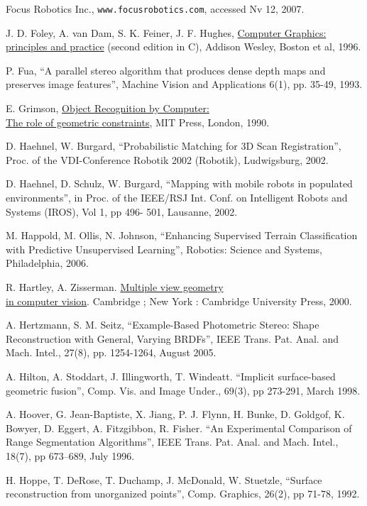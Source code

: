 \documentclass[twocolumn,oneside]{book}
\begin{document}
\begin{thebibliography}{99}
Focus Robotics Inc.,
\verb+www.focusrobotics.com+, accessed Nv 12, 2007.

J. D. Foley, A. van Dam, S. K. Feiner, J. F. Hughes,
{\underline{Computer Graphics: principles and practice}} (second edition in C),
Addison Wesley, Boston et al, 1996.

P. Fua,
``A parallel stereo algorithm that produces dense depth maps and preserves image features'',
Machine Vision and Applications 6(1), pp. 35-49, 1993.

E. Grimson,
{\underline {Object Recognition by Computer:}}\\{\underline {The role of geometric constraints}},
MIT Press, London, 1990.

D. Haehnel, W. Burgard,
``Probabilistic Matching for 3D Scan Registration'',
Proc. of the VDI-Conference Robotik 2002 (Robotik), Ludwigsburg, 2002.

D. Haehnel, D. Schulz, W. Burgard,
``Mapping with mobile robots in populated environments'',
in Proc. of the IEEE/RSJ Int. Conf. on Intelligent
Robots and Systems (IROS), Vol 1, pp 496- 501, Lausanne, 2002.

M. Happold, M. Ollis, N. Johnson,
``Enhancing Supervised Terrain Classification with Predictive Unsupervised Learning'',
Robotics: Science and Systems, Philadelphia, 2006.

R. Hartley, A. Zisserman.
{\underline{Multiple view geometry}}\\{\underline{in computer vision}}.
Cambridge ; New York : Cambridge University Press, 2000.

A. Hertzmann, S. M. Seitz, 
``Example-Based Photometric Stereo: Shape Reconstruction with General, Varying BRDFs'',
IEEE Trans. Pat. Anal. and Mach. Intel., 27(8), pp. 1254-1264, August 2005.

A. Hilton, A. Stoddart, J. Illingworth, T. Windeatt.
``Implicit surface-based geometric fusion'',
Comp. Vis. and Image Under., 69(3), pp 273-291, March 1998.

A. Hoover, G. Jean-Baptiste, X. Jiang, P. J. Flynn,
H. Bunke, D. Goldgof, K. Bowyer,
D. Eggert, A. Fitzgibbon, R. Fisher.
``An Experimental Comparison of Range Segmentation Algorithms'',
IEEE Trans. Pat. Anal. and Mach. Intel., 18(7), pp 673--689, July 1996.

H. Hoppe, T. DeRose, T. Duchamp, J. McDonald, W. Stuetzle,
``Surface reconstruction from unorganized points'',
Comp. Graphics, 26(2), pp 71-78, 1992.


\end{thebibliography}
\end{document}
